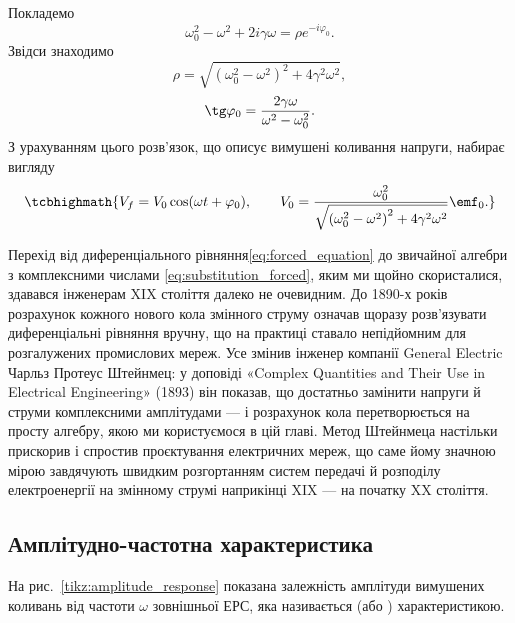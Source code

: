 Покладемо
\begin{equation}\label{eq:polar_form}
	\omega_0^2 - \omega^2 + 2i\gamma\omega = \rho e^{-i\varphi_0}.
\end{equation}
Звідси знаходимо
\begin{equation}\label{eq:rho_phi}
	\rho = \sqrt{\left(\omega_0^2 - \omega^2\right)^2 + 4\gamma^2\omega^2},
\end{equation}
\begin{equation}\label{eq:tg_phi0}
	\tg\varphi_0 = \frac{2\gamma\omega}{\omega^2 - \omega_0^2}.
\end{equation}
З урахуванням цього розв'язок, що описує вимушені коливання напруги, набирає вигляду
\begin{equation}\label{eq:forced_voltage}
	\tcbhighmath{
		V_f = V_0 \cos(\omega t + \varphi_0), \qquad
		V_0 = \frac{\omega_0^2}{\sqrt{\left(\omega_0^2 - \omega^2\right)^2 + 4\gamma^2\omega^2}}\emf_0.
	}
\end{equation}

\begin{Attention}
	Перехід від диференціального рівняння\eqref{eq:forced_equation} до звичайної алгебри з комплексними числами \eqref{eq:substitution_forced}, яким ми щойно скористалися, здавався інженерам XIX століття далеко не очевидним. До 1890-х років розрахунок кожного нового кола змінного струму означав щоразу розв'язувати диференціальні рівняння вручну, що на практиці ставало непідйомним для розгалужених промислових мереж. Усе змінив інженер компанії General Electric Чарльз Протеус Штейнмец: у доповіді «Complex Quantities and Their Use in Electrical Engineering» (1893) він показав, що достатньо замінити напруги й струми комплексними амплітудами --- і розрахунок кола перетворюється на просту алгебру, якою ми користуємося в цій главі. Метод Штейнмеца настільки прискорив і спростив проєктування електричних мереж, що саме йому значною мірою завдячують швидким розгортанням систем передачі й розподілу електроенергії на змінному струмі наприкінці XIX --- на початку XX століття.
\end{Attention}

\subsection*{Амплітудно-частотна характеристика}

На рис.~\ref{tikz:amplitude_response} показана залежність амплітуди вимушених коливань від частоти $\omega$ зовнішньої ЕРС, яка називається  (або ) характеристикою.

